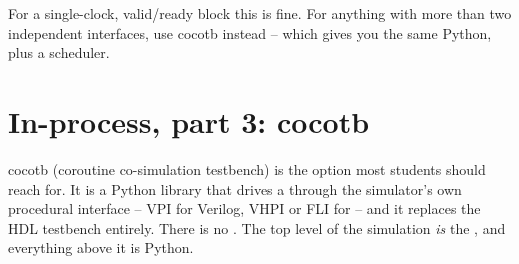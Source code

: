 For a single-clock, valid/ready block this is fine. For anything with more
than two independent interfaces, use cocotb instead -- which gives you the
same Python, plus a scheduler.

\section{In-process, part 3: cocotb}
\label{sec:python:cocotb}

cocotb (coroutine co-simulation testbench) is the option most students should
reach for. It is a Python library that drives a \DUT{} through the
simulator's own procedural interface -- VPI for Verilog, VHPI or FLI for
\VHDL{} -- and it replaces the HDL testbench entirely. There is no
. The top level of the simulation \emph{is} the \DUT{}, and
everything above it is Python.

